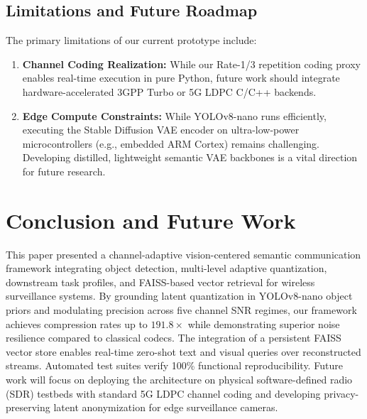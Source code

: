 \documentclass[journal,twocolumn]{IEEEtran}
\begin{document}
\subsection{Limitations and Future Roadmap}
The primary limitations of our current prototype include:
\begin{enumerate}
    \item \textbf{Channel Coding Realization:} While our Rate-1/3 repetition coding proxy enables real-time execution in pure Python, future work should integrate hardware-accelerated 3GPP Turbo or 5G LDPC C/C++ backends.
    \item \textbf{Edge Compute Constraints:} While YOLOv8-nano runs efficiently, executing the Stable Diffusion VAE encoder on ultra-low-power microcontrollers (e.g., embedded ARM Cortex) remains challenging. Developing distilled, lightweight semantic VAE backbones is a vital direction for future research.
\end{enumerate}

\section{Conclusion and Future Work}
This paper presented a channel-adaptive vision-centered semantic communication framework integrating object detection, multi-level adaptive quantization, downstream task profiles, and FAISS-based vector retrieval for wireless surveillance systems. By grounding latent quantization in YOLOv8-nano object priors and modulating precision across five channel SNR regimes, our framework achieves compression rates up to $191.8\times$ while demonstrating superior noise resilience compared to classical codecs. The integration of a persistent FAISS vector store enables real-time zero-shot text and visual queries over reconstructed streams. Automated test suites verify 100\% functional reproducibility. Future work will focus on deploying the architecture on physical software-defined radio (SDR) testbeds with standard 5G LDPC channel coding and developing privacy-preserving latent anonymization for edge surveillance cameras.



\end{document}
